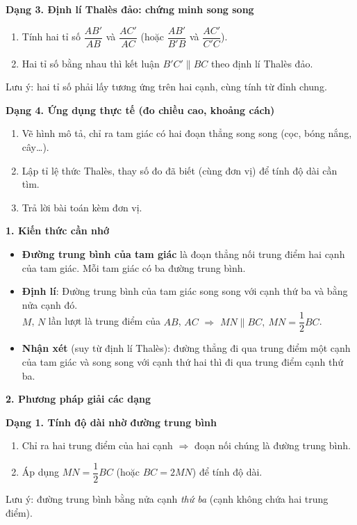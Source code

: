 \textbf{Dạng 3. Định lí Thalès đảo: chứng minh song song}
\begin{enumerate}
\item Tính hai tỉ số $\dfrac{AB'}{AB}$ và $\dfrac{AC'}{AC}$ (hoặc $\dfrac{AB'}{B'B}$ và $\dfrac{AC'}{C'C}$).
\item Hai tỉ số bằng nhau thì kết luận $B'C'\parallel BC$ theo định lí Thalès đảo.
\end{enumerate}
Lưu ý: hai tỉ số phải lấy tương ứng trên hai cạnh, cùng tính từ đỉnh chung.

\textbf{Dạng 4. Ứng dụng thực tế (đo chiều cao, khoảng cách)}
\begin{enumerate}
\item Vẽ hình mô tả, chỉ ra tam giác có hai đoạn thẳng song song (cọc, bóng nắng, cây\dots).
\item Lập tỉ lệ thức Thalès, thay số đo đã biết (cùng đơn vị) để tính độ dài cần tìm.
\item Trả lời bài toán kèm đơn vị.
\end{enumerate}

\par{}\par\smallskip
\textbf{1. Kiến thức cần nhớ}
\begin{itemize}
\item \textbf{Đường trung bình của tam giác} là đoạn thẳng nối trung điểm hai cạnh của tam giác. Mỗi tam giác có ba đường trung bình.
\item \textbf{Định lí}: Đường trung bình của tam giác song song với cạnh thứ ba và bằng nửa cạnh đó.\\
$M$, $N$ lần lượt là trung điểm của $AB$, $AC$ $\Rightarrow$ $\boxed{MN\parallel BC,\ MN=\dfrac12BC}$.
\item \textbf{Nhận xét} (suy từ định lí Thalès): đường thẳng đi qua trung điểm một cạnh của tam giác và song song với cạnh thứ hai thì đi qua trung điểm cạnh thứ ba.
\end{itemize}

\textbf{2. Phương pháp giải các dạng}

\textbf{Dạng 1. Tính độ dài nhờ đường trung bình}
\begin{enumerate}
\item Chỉ ra hai trung điểm của hai cạnh $\Rightarrow$ đoạn nối chúng là đường trung bình.
\item Áp dụng $MN=\dfrac12BC$ (hoặc $BC=2MN$) để tính độ dài.
\end{enumerate}
Lưu ý: đường trung bình bằng nửa cạnh \textit{thứ ba} (cạnh không chứa hai trung điểm).

